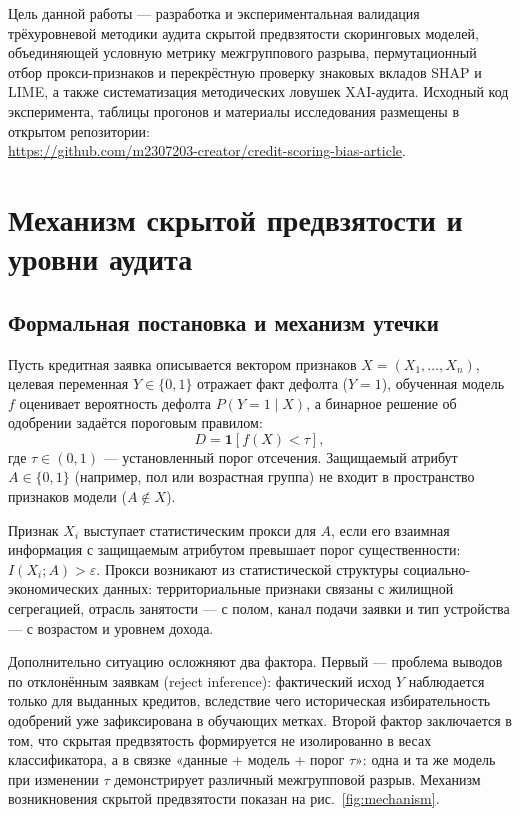 \documentclass{misisarticle}
\begin{document}
Цель данной работы — разработка и экспериментальная валидация трёхуровневой методики аудита скрытой предвзятости скоринговых моделей, объединяющей условную метрику межгруппового разрыва, пермутационный отбор прокси-признаков и перекрёстную проверку знаковых вкладов SHAP и LIME, а также систематизация методических ловушек XAI-аудита. Исходный код эксперимента, таблицы прогонов и материалы исследования размещены в открытом репозитории:\\
\url{https://github.com/m2307203-creator/credit-scoring-bias-article}.

\section{Механизм скрытой предвзятости и уровни аудита}

\subsection{Формальная постановка и механизм утечки}

Пусть кредитная заявка описывается вектором признаков $X = (X_1, \dots, X_n)$, целевая переменная $Y \in \{0, 1\}$ отражает факт дефолта ($Y = 1$), обученная модель $f$ оценивает вероятность дефолта $P(Y = 1 \mid X)$, а бинарное решение об одобрении задаётся пороговым правилом:
\begin{equation}
D = \mathbf{1}[f(X) < \tau],
\label{eq:decision}
\end{equation}
где $\tau \in (0, 1)$ — установленный порог отсечения. Защищаемый атрибут $A \in \{0, 1\}$ (например, пол или возрастная группа) не входит в пространство признаков модели ($A \notin X$).

Признак $X_i$ выступает статистическим прокси для $A$, если его взаимная информация с защищаемым атрибутом превышает порог существенности: $I(X_i; A) > \varepsilon$. Прокси возникают из статистической структуры социально-экономических данных: территориальные признаки связаны с жилищной сегрегацией, отрасль занятости — с полом, канал подачи заявки и тип устройства — с возрастом и уровнем дохода.

Дополнительно ситуацию осложняют два фактора. Первый — проблема выводов по отклонённым заявкам (reject inference): фактический исход $Y$ наблюдается только для выданных кредитов, вследствие чего историческая избирательность одобрений уже зафиксирована в обучающих метках. Второй фактор заключается в том, что скрытая предвзятость формируется не изолированно в весах классификатора, а в связке «данные + модель + порог $\tau$»: одна и та же модель при изменении $\tau$ демонстрирует различный межгрупповой разрыв. Механизм возникновения скрытой предвзятости показан на рис.~\ref{fig:mechanism}.
\end{document}
